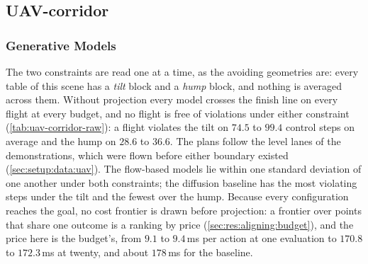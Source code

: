 \subsection{UAV-corridor}\label{sec:res:uav:corridor}

\subsubsection{Generative Models}\label{sec:res:uav:corridor:raw}
The two constraints are read one at a time, as the avoiding geometries are: every table of this scene has a
\emph{tilt} block and a \emph{hump} block, and nothing is averaged across them.
Without projection every model crosses the finish line on every flight at every budget, and no flight is
free of violations under either constraint (\autoref{tab:uav-corridor-raw}): a flight violates the tilt on
$74.5$ to $99.4$ control steps on average and the hump on $28.6$ to $36.6$. The plans follow the level
lanes of the demonstrations, which were flown before either boundary existed
(\autoref{sec:setup:data:uav}). The flow-based models lie within one standard deviation of one another
under both constraints; the diffusion baseline has the most violating steps under the tilt and the fewest
over the hump. Because every configuration reaches the goal, no cost frontier is drawn before projection:
a frontier over points that share one outcome is a ranking by price (\autoref{sec:res:aligning:budget}),
and the price here is the budget's, from $9.1$ to $9.4$\,ms per action at one evaluation to $170.8$ to
$172.3$\,ms at twenty, and about $178$\,ms for the baseline.

